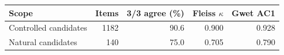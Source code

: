 \begin{tabular}{lrrrr}
\toprule
Scope & Items & 3/3 agree (\%) & Fleiss $\kappa$ & Gwet AC1\\
\midrule
Controlled candidates & 1182 & 90.6 & 0.900 & 0.928\\
Natural candidates & 140 & 75.0 & 0.705 & 0.790\\
\bottomrule
\end{tabular}

